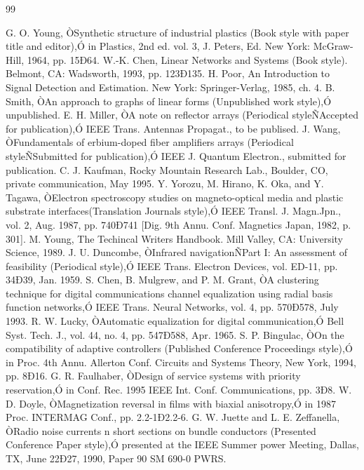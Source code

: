 \documentclass[letterpaper, 10 pt, conference]{ieeeconf}  %
\begin{document}
\begin{thebibliography}{99}

 G. O. Young, ÒSynthetic structure of industrial plastics (Book style with paper title and editor),Ó 	in Plastics, 2nd ed. vol. 3, J. Peters, Ed.  New York: McGraw-Hill, 1964, pp. 15Ð64.
 W.-K. Chen, Linear Networks and Systems (Book style).	Belmont, CA: Wadsworth, 1993, pp. 123Ð135.
 H. Poor, An Introduction to Signal Detection and Estimation.   New York: Springer-Verlag, 1985, ch. 4.
 B. Smith, ÒAn approach to graphs of linear forms (Unpublished work style),Ó unpublished.
 E. H. Miller, ÒA note on reflector arrays (Periodical styleÑAccepted for publication),Ó IEEE Trans. Antennas Propagat., to be publised.
 J. Wang, ÒFundamentals of erbium-doped fiber amplifiers arrays (Periodical styleÑSubmitted for publication),Ó IEEE J. Quantum Electron., submitted for publication.
 C. J. Kaufman, Rocky Mountain Research Lab., Boulder, CO, private communication, May 1995.
 Y. Yorozu, M. Hirano, K. Oka, and Y. Tagawa, ÒElectron spectroscopy studies on magneto-optical media and plastic substrate interfaces(Translation Journals style),Ó IEEE Transl. J. Magn.Jpn., vol. 2, Aug. 1987, pp. 740Ð741 [Dig. 9th Annu. Conf. Magnetics Japan, 1982, p. 301].
 M. Young, The Techincal Writers Handbook.  Mill Valley, CA: University Science, 1989.
 J. U. Duncombe, ÒInfrared navigationÑPart I: An assessment of feasibility (Periodical style),Ó IEEE Trans. Electron Devices, vol. ED-11, pp. 34Ð39, Jan. 1959.
 S. Chen, B. Mulgrew, and P. M. Grant, ÒA clustering technique for digital communications channel equalization using radial basis function networks,Ó IEEE Trans. Neural Networks, vol. 4, pp. 570Ð578, July 1993.
 R. W. Lucky, ÒAutomatic equalization for digital communication,Ó Bell Syst. Tech. J., vol. 44, no. 4, pp. 547Ð588, Apr. 1965.
 S. P. Bingulac, ÒOn the compatibility of adaptive controllers (Published Conference Proceedings style),Ó in Proc. 4th Annu. Allerton Conf. Circuits and Systems Theory, New York, 1994, pp. 8Ð16.
 G. R. Faulhaber, ÒDesign of service systems with priority reservation,Ó in Conf. Rec. 1995 IEEE Int. Conf. Communications, pp. 3Ð8.
 W. D. Doyle, ÒMagnetization reversal in films with biaxial anisotropy,Ó in 1987 Proc. INTERMAG Conf., pp. 2.2-1Ð2.2-6.
 G. W. Juette and L. E. Zeffanella, ÒRadio noise currents n short sections on bundle conductors (Presented Conference Paper style),Ó presented at the IEEE Summer power Meeting, Dallas, TX, June 22Ð27, 1990, Paper 90 SM 690-0 PWRS.

\end{thebibliography}
\end{document}
